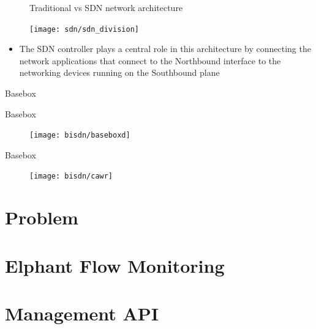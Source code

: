 \documentclass{beamer}
\begin{document}
\begin{frame}
    \begin{figure}[!tbph]
      \centering
      \caption {Traditional vs SDN network architecture}
    \end{figure}
\end{frame}

\begin{frame}
    \begin{figure}[!tbph]
        \centering
        \texttt{[image: sdn/sdn\_division]}
    \end{figure}
    \begin{itemize}
        \item The SDN controller plays a central role in this architecture by connecting the network applications that connect to the Northbound interface to the
            networking devices running on the Southbound plane
    \end{itemize}
\end{frame}

\begin{frame}{Basebox}
\end{frame}

\begin{frame}{Basebox}
    \begin{figure}[!tbph]
        \centering
        \texttt{[image: bisdn/baseboxd]}
    \end{figure}

\end{frame}

\begin{frame}{Basebox}
    \begin{figure}[!tbph]
        \centering
        \texttt{[image: bisdn/cawr]}
    \end{figure}

\end{frame}
\section{Problem}
\section{Elphant Flow Monitoring}
\section{Management API}
\end{document}
